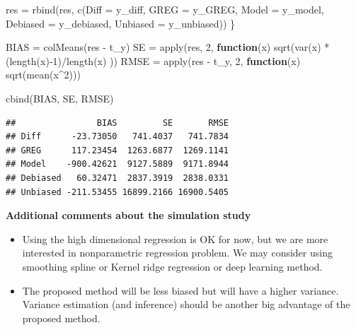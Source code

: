 \documentclass[
]{article}
\newenvironment{Shaded}{\begin{snugshade}}{\end{snugshade}}
\newcommand{\AttributeTok}[1]{\textcolor[rgb]{0.77,0.63,0.00}{#1}}
\newcommand{\ControlFlowTok}[1]{\textcolor[rgb]{0.13,0.29,0.53}{\textbf{#1}}}
\newcommand{\DecValTok}[1]{\textcolor[rgb]{0.00,0.00,0.81}{#1}}
\newcommand{\FunctionTok}[1]{\textcolor[rgb]{0.00,0.00,0.00}{#1}}
\newcommand{\NormalTok}[1]{#1}
\newcommand{\OtherTok}[1]{\textcolor[rgb]{0.56,0.35,0.01}{#1}}
\newcommand{\SpecialCharTok}[1]{\textcolor[rgb]{0.00,0.00,0.00}{#1}}
\begin{document}
\begin{Shaded}
\begin{Highlighting}[]
\NormalTok{res }\OtherTok{=} \FunctionTok{rbind}\NormalTok{(res, }\FunctionTok{c}\NormalTok{(}\AttributeTok{Diff =}\NormalTok{ y\_diff, }\AttributeTok{GREG =}\NormalTok{ y\_GREG, }\AttributeTok{Model =}\NormalTok{ y\_model, }\AttributeTok{Debiased =}\NormalTok{ y\_debiased, }\AttributeTok{Unbiased =}\NormalTok{ y\_unbiased))}
\NormalTok{\}}

\NormalTok{BIAS }\OtherTok{=} \FunctionTok{colMeans}\NormalTok{(res }\SpecialCharTok{{-}}\NormalTok{ t\_y)}
\NormalTok{SE }\OtherTok{=} \FunctionTok{apply}\NormalTok{(res, }\DecValTok{2}\NormalTok{, }\ControlFlowTok{function}\NormalTok{(x) }\FunctionTok{sqrt}\NormalTok{(}\FunctionTok{var}\NormalTok{(x) }\SpecialCharTok{*}\NormalTok{ (}\FunctionTok{length}\NormalTok{(x)}\SpecialCharTok{{-}}\DecValTok{1}\NormalTok{)}\SpecialCharTok{/}\FunctionTok{length}\NormalTok{(x) ))}
\NormalTok{RMSE }\OtherTok{=} \FunctionTok{apply}\NormalTok{(res }\SpecialCharTok{{-}}\NormalTok{ t\_y, }\DecValTok{2}\NormalTok{, }\ControlFlowTok{function}\NormalTok{(x) }\FunctionTok{sqrt}\NormalTok{(}\FunctionTok{mean}\NormalTok{(x}\SpecialCharTok{\^{}}\DecValTok{2}\NormalTok{)))}

\FunctionTok{cbind}\NormalTok{(BIAS, SE, RMSE)}
\end{Highlighting}
\end{Shaded}

\begin{verbatim}
##                BIAS         SE       RMSE
## Diff      -23.73050   741.4037   741.7834
## GREG      117.23454  1263.6877  1269.1141
## Model    -900.42621  9127.5889  9171.8944
## Debiased   60.32471  2837.3919  2838.0331
## Unbiased -211.53455 16899.2166 16900.5405
\end{verbatim}

{\bf Additional comments about the simulation study}
\begin{itemize}
\item Using the high dimensional regression is OK for now, but we are more interested in nonparametric regression problem. We may consider using smoothing spline or Kernel ridge regression or deep learning method. 
\item The proposed method will be less biased but will have a higher variance. Variance estimation (and inference) should be another big advantage of the proposed method. 
\end{itemize}
\end{document}
